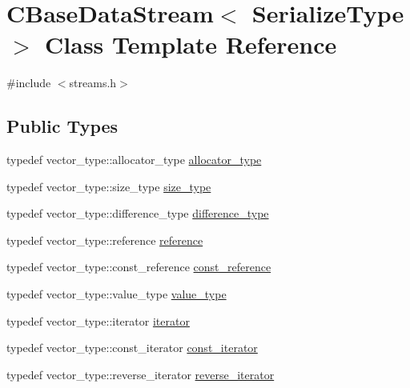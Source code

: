 \hypertarget{class_c_base_data_stream}{}\section{C\+Base\+Data\+Stream$<$ Serialize\+Type $>$ Class Template Reference}
\label{class_c_base_data_stream}


{\ttfamily \#include $<$streams.\+h$>$}

\subsection*{Public Types}
\begin{DoxyCompactItemize}
\item 
typedef vector\+\_\+type\+::allocator\+\_\+type \mbox{\hyperlink{class_c_base_data_stream_ae303e09f19f77d2d95ac99feabbeb6c3}{allocator\+\_\+type}}
\item 
typedef vector\+\_\+type\+::size\+\_\+type \mbox{\hyperlink{class_c_base_data_stream_ad042ddea628c43357b9b13be89c71964}{size\+\_\+type}}
\item 
typedef vector\+\_\+type\+::difference\+\_\+type \mbox{\hyperlink{class_c_base_data_stream_a85d79377e715b717baa8cb68cf753bd0}{difference\+\_\+type}}
\item 
typedef vector\+\_\+type\+::reference \mbox{\hyperlink{class_c_base_data_stream_a74ec577e6f675c786880b39700b8f317}{reference}}
\item 
typedef vector\+\_\+type\+::const\+\_\+reference \mbox{\hyperlink{class_c_base_data_stream_aabfd39998036383d2ee384029f221aab}{const\+\_\+reference}}
\item 
typedef vector\+\_\+type\+::value\+\_\+type \mbox{\hyperlink{class_c_base_data_stream_a92957c776eb4c9a7668dd9cd82f7dbdd}{value\+\_\+type}}
\item 
typedef vector\+\_\+type\+::iterator \mbox{\hyperlink{class_c_base_data_stream_a23e0e0af1c68dd36c27162036b6d048d}{iterator}}
\item 
typedef vector\+\_\+type\+::const\+\_\+iterator \mbox{\hyperlink{class_c_base_data_stream_a9cf3080c5a75c94568980a59d3aab3ad}{const\+\_\+iterator}}
\item 
typedef vector\+\_\+type\+::reverse\+\_\+iterator \mbox{\hyperlink{class_c_base_data_stream_aecb04ae414c994e0c43aa0ed423b8824}{reverse\+\_\+iterator}}
\end{DoxyCompactItemize}
